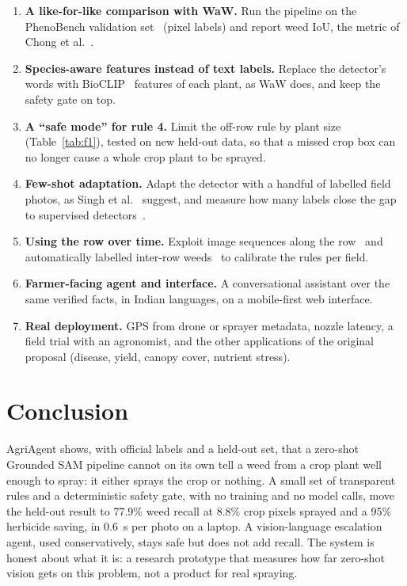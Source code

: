 \begin{enumerate}
\item \textbf{A like-for-like comparison with WaW.} Run the pipeline on the PhenoBench validation
  set~\cite{weyler2024phenobench} (pixel labels) and report weed IoU, the metric of Chong et
  al.~\cite{chong2025zeroshot}.
\item \textbf{Species-aware features instead of text labels.} Replace the detector's words with
  BioCLIP~\cite{stevens2024bioclip} features of each plant, as WaW does, and keep the safety gate on
  top.
\item \textbf{A ``safe mode'' for rule 4.} Limit the off-row rule by plant size (Table~\ref{tab:f1}),
  tested on new held-out data, so that a missed crop box can no longer cause a whole crop plant to be sprayed.
\item \textbf{Few-shot adaptation.} Adapt the detector with a handful of labelled field photos, as
  Singh et al.~\cite{singh2025fewshot} suggest, and measure how many labels close the gap to supervised
  detectors~\cite{rahman2023cotton,dang2023yoloweeds}.
\item \textbf{Using the row over time.} Exploit image sequences along the row~\cite{lottes2018fcn,lottes2020stem}
  and automatically labelled inter-row weeds~\cite{bah2018unsupervised} to calibrate the rules per field.
\item \textbf{Farmer-facing agent and interface.} A conversational assistant over the same verified
  facts, in Indian languages, on a mobile-first web interface.
\item \textbf{Real deployment.} GPS from drone or sprayer metadata, nozzle latency, a field trial with
  an agronomist, and the other applications of the original proposal (disease, yield, canopy cover,
  nutrient stress).
\end{enumerate}

\section{Conclusion}
AgriAgent shows, with official labels and a held-out set, that a zero-shot Grounded SAM pipeline cannot
on its own tell a weed from a crop plant well enough to spray: it either sprays the crop or nothing. A
small set of transparent rules and a deterministic safety gate, with no training and no model calls,
move the held-out result to 77.9\% weed recall at 8.8\% crop pixels sprayed and a 95\% herbicide saving,
in 0.6~s per photo on a laptop. A vision-language escalation agent, used conservatively, stays safe but
does not add recall. The system is honest about what it is: a research prototype that measures how far
zero-shot vision gets on this problem, not a product for real spraying.

